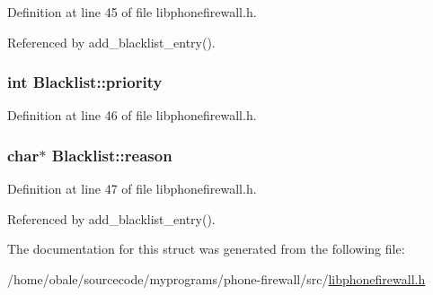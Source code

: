 Definition at line 45 of file libphonefirewall.h.

Referenced by add\_\-blacklist\_\-entry().\hypertarget{structBlacklist_a5370eb6240b6e528ce56fb10d7e9249}{
\subsubsection{\setlength{\rightskip}{0pt plus 5cm}int {\bf Blacklist::priority}}}
\label{structBlacklist_a5370eb6240b6e528ce56fb10d7e9249}




Definition at line 46 of file libphonefirewall.h.\hypertarget{structBlacklist_4aaebfcc863267f326258e0622bf7303}{
\subsubsection{\setlength{\rightskip}{0pt plus 5cm}char$\ast$ {\bf Blacklist::reason}}}
\label{structBlacklist_4aaebfcc863267f326258e0622bf7303}




Definition at line 47 of file libphonefirewall.h.

Referenced by add\_\-blacklist\_\-entry().

The documentation for this struct was generated from the following file:\begin{CompactItemize}
\item 
/home/obale/sourcecode/myprograms/phone-firewall/src/\hyperlink{libphonefirewall_8h}{libphonefirewall.h}\end{CompactItemize}
